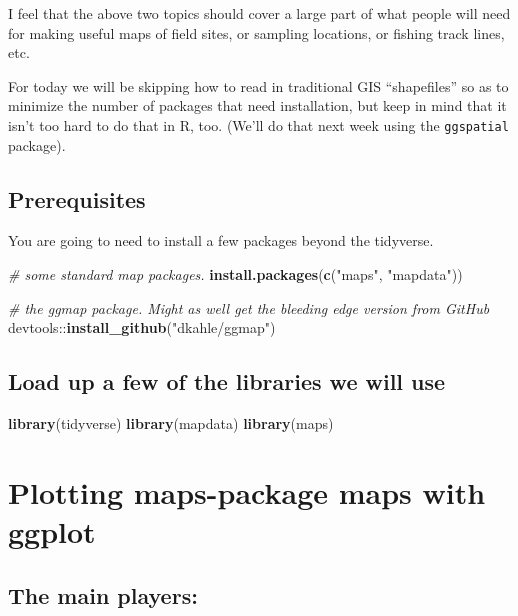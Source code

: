 \documentclass[]{book}
\newenvironment{Shaded}{\begin{snugshade}}{\end{snugshade}}
\newcommand{\KeywordTok}[1]{\textcolor[rgb]{0.13,0.29,0.53}{\textbf{{#1}}}}
\newcommand{\StringTok}[1]{\textcolor[rgb]{0.31,0.60,0.02}{{#1}}}
\newcommand{\CommentTok}[1]{\textcolor[rgb]{0.56,0.35,0.01}{\textit{{#1}}}}
\newcommand{\NormalTok}[1]{{#1}}
\theoremstyle{definition}
\theoremstyle{definition}
\theoremstyle{remark}
\begin{document}
I feel that the above two topics should cover a large part of what
people will need for making useful maps of field sites, or sampling
locations, or fishing track lines, etc.

For today we will be skipping how to read in traditional GIS
``shapefiles'' so as to minimize the number of packages that need
installation, but keep in mind that it isn't too hard to do that in R,
too. (We'll do that next week using the \texttt{ggspatial} package).

\subsection{Prerequisites}\label{prerequisites}

You are going to need to install a few packages beyond the tidyverse.

\begin{Shaded}
\begin{Highlighting}[]
\CommentTok{# some standard map packages.}
\KeywordTok{install.packages}\NormalTok{(}\KeywordTok{c}\NormalTok{(}\StringTok{"maps"}\NormalTok{, }\StringTok{"mapdata"}\NormalTok{))}

\CommentTok{# the ggmap package.  Might as well get the bleeding edge version from GitHub}
\NormalTok{devtools::}\KeywordTok{install_github}\NormalTok{(}\StringTok{"dkahle/ggmap"}\NormalTok{)}
\end{Highlighting}
\end{Shaded}

\subsection{Load up a few of the libraries we will
use}\label{load-up-a-few-of-the-libraries-we-will-use}

\begin{Shaded}
\begin{Highlighting}[]
\KeywordTok{library}\NormalTok{(tidyverse)}
\KeywordTok{library}\NormalTok{(mapdata)}
\KeywordTok{library}\NormalTok{(maps)}
\end{Highlighting}
\end{Shaded}

\section{Plotting maps-package maps with
ggplot}\label{maps-package-and-ggplot}

\subsection{The main players:}\label{the-main-players}
\end{document}

